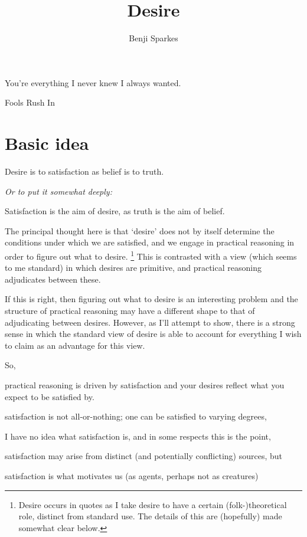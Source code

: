 \documentclass[10pt]{article}
\title{Desire}
\author{Benji Sparkes}
\begin{document}
\maketitle
\epigraph{You're everything I never knew I always wanted.}{Fools Rush In}



\section{Basic idea}
\label{sec:basic-idea}


\begin{center}
  Desire is to satisfaction as belief is to truth.

  \emph{Or to put it somewhat deeply:}

  Satisfaction is the aim of desire, as truth is the aim of belief.
\end{center}

The principal thought here is that `desire' does not by itself determine the conditions under which we are satisfied, and we engage in practical reasoning in order to figure out what to desire.\nolinebreak
\footnote{Desire occurs in quotes as I take desire to have a certain (folk-)theoretical role, distinct from standard use.
  The details of this are (hopefully) made somewhat clear below.}
This is contrasted with a view (which seems to me standard) in which desires are primitive, and practical reasoning adjudicates between these.

If this is right, then figuring out what to desire is an interesting problem and the structure of practical reasoning may have a different shape to that of adjudicating between desires.
However, as I'll attempt to show, there is a strong sense in which the standard view of desire is able to account for everything I wish to claim as an advantage for this view.

So, \nolinebreak
\begin{enumerate*}[label=\alph*)]
\item practical reasoning is driven by satisfaction and your desires reflect what you expect to be satisfied by.
\item satisfaction is not all-or-nothing; one can be satisfied to varying degrees,
\item I have no idea what satisfaction is, and in some respects this is the point,
\item satisfaction may arise from distinct (and potentially conflicting) sources, but
\item satisfaction is what motivates us (as agents, perhaps not as creatures)
\end{enumerate*}
\end{document}
